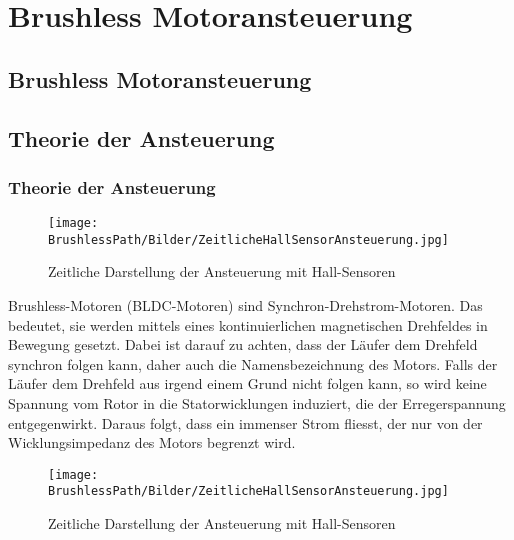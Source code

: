 \ifSTANDALONE
\section{Brushless Motoransteuerung}
\fi
\ifEMBED
\subsection{Brushless Motoransteuerung}
\fi

\ifEMBED
    \BLDCcollab
\fi
    \ifSTANDALONE
    \subsection{Theorie der Ansteuerung}
    \fi
    \ifEMBED
    \subsubsection{Theorie der Ansteuerung}
    \fi
    \ifEMBED
        \begin{wrapfigure}{r}{0.50\textwidth}
           	\texttt{[image: \\BrushlessPath/Bilder/ZeitlicheHallSensorAnsteuerung.jpg]}
           	\caption[Zeitliche Darstellung der Ansteuerung mit 
                Hall-Sensoren]{Zeitliche Darstellung der Ansteuerung mit 
                Hall-Sensoren \cite{AppNote:BrushlessuC}}
           	\centering
            \label{abb:ZeitlicheAnsteuerungBrushlessMotor}
        \end{wrapfigure}
    \fi
        Brushless-Motoren (BLDC-Motoren) sind Synchron-Drehstrom-Motoren. Das bedeutet, sie 
        werden mittels eines kontinuierlichen magnetischen Drehfeldes in Bewegung gesetzt. 
        Dabei ist darauf zu achten, dass der Läufer dem Drehfeld synchron 
        folgen kann, daher auch die Namensbezeichnung des Motors. Falls der Läufer dem Drehfeld aus irgend 
        einem Grund nicht folgen kann, so wird keine Spannung vom Rotor in die 
        Statorwicklungen induziert, die der Erregerspannung entgegenwirkt. 
        Daraus folgt, dass ein immenser Strom fliesst, der nur von der 
        Wicklungsimpedanz des Motors begrenzt wird.\\
        \ifSTANDALONE
           \begin{figure}[h!]
               \centering
               \texttt{[image: \\BrushlessPath/Bilder/ZeitlicheHallSensorAnsteuerung.jpg]}
               \caption[Zeitliche Darstellung der Ansteuerung mit 
                   Hall-Sensoren]{Zeitliche Darstellung der Ansteuerung mit 
                   Hall-Sensoren \cite{AppNote:BrushlessuC}}
              	\centering
               \label{abb:ZeitlicheAnsteuerungBrushlessMotor}
           \end{figure}

